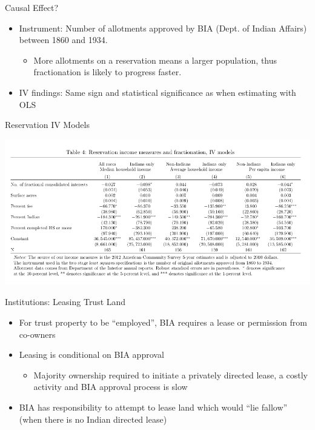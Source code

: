 \documentclass[ignorenonframetext,]{beamer}
\begin{document}
\begin{frame}{Causal Effect?}

\begin{itemize}
\itemsep1pt\parskip0pt
\item
  Instrument: Number of allotments approved by BIA (Dept. of Indian
  Affairs) between 1860 and 1934.

  \begin{itemize}
  \itemsep1pt\parskip0pt
  \item
    More allotments on a reservation means a larger population, thus
    fractionation is likely to progress faster.
  \end{itemize}
\item
  IV findings: Same sign and statistical significance as when estimating
  with OLS
\end{itemize}

\end{frame}

\begin{frame}{Reservation IV Models}

\centering
\includegraphics{Table4.png}

\end{frame}

\begin{frame}{Institutions: Leasing Trust Land}

\begin{itemize}
\item
  For trust property to be ``employed'', BIA requires a lease or
  permission from co-owners
\item
  Leasing is conditional on BIA approval

  \begin{itemize}
  \itemsep1pt\parskip0pt
  \item
    Majority ownership required to initiate a privately directed lease,
    a costly activity and BIA approval process is slow
  \end{itemize}
\item
  BIA has responsibility to attempt to lease land which would ``lie
  fallow'' (when there is no Indian directed lease)
\end{itemize}

\end{frame}
\end{document}
